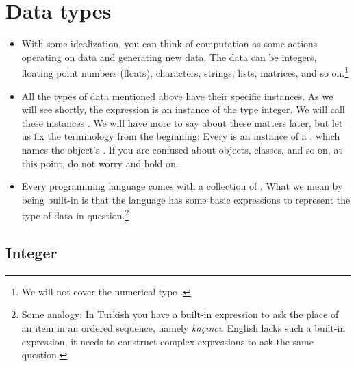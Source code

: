 \documentclass[a4paper]{article}
\begin{document}
\section{Data types}

\begin{itemize}

\item With some idealization, you can think of computation as some actions
operating on data and generating new data. The data can be integers, floating
point numbers (floats), characters, strings, lists, matrices, and so
on.\footnote{We will not cover the numerical type .}

\item All the types of data mentioned above have their specific instances. As we
will see shortly, the expression  is an instance of the type integer. We
will call these instances . We will have more to say about these
matters later, but let us fix the terminology from the beginning: Every
 is an instance of a , which names the object's
. If you are confused about objects, classes, and so on, at this
point, do not worry and hold on. 

\item Every programming language comes with a collection of . What we mean by being built-in is that the language has some basic
expressions to represent the type of data in question.\footnote{Some analogy: In
Turkish you have a built-in expression to ask the place of an item in an ordered
sequence, namely \emph{ka\c c\i{}nc\i{}}. English lacks such a built-in
expression, it needs to construct complex expressions to ask the same question.}

\end{itemize}

\subsection{Integer}
\end{document}
